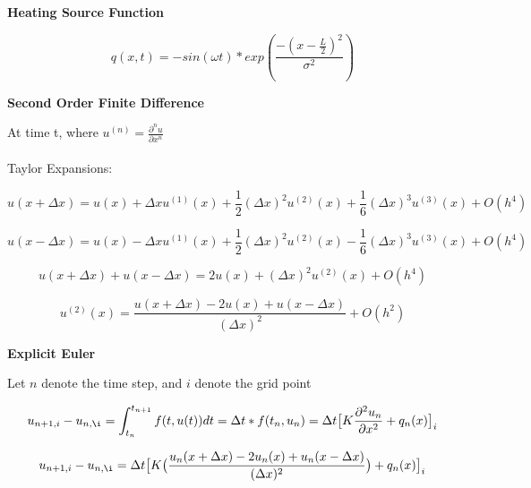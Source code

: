 \documentclass[10pt, letter, showtrims]{extarticle}
\begin{document}
		\noindent
		\textbf{Heating Source Function}
		
		
		\begin{equation}
			q(x, t) = -sin(\omega t) * exp\left(\frac{-(x - \frac{L}{2})^{2}}{\sigma^{2}}\right)
		\end{equation}	
	
		\noindent
		\textbf{Second Order Finite Difference}
		
		\noindent
		At time t, where $u^{(n)} = \frac{\partial^{n} u}{\partial x^{n}}$  \\ \\
		Taylor Expansions:
		
		\begin{equation}
			u(x + \Delta x) = u(x) + \Delta x u^{(1)}(x) + \frac{1}{2} (\Delta x)^{2} u^{(2)}(x) + \frac{1}{6} (\Delta x)^{3} u^{(3)}(x) + O(h^{4})
		\end{equation}	
		
		\begin{equation}
			u(x - \Delta x) = u(x) - \Delta x u^{(1)}(x) + \frac{1}{2} (\Delta x)^{2} u^{(2)}(x) - \frac{1}{6} (\Delta x)^{3} u^{(3)}(x) + O(h^{4})
		\end{equation}
		
		\begin{equation}
			u(x + \Delta x) + u(x - \Delta x) = 2u(x) + (\Delta x)^{2} u^{(2)}(x) + O(h^{4})
		\end{equation}	
		
		\begin{equation}
			u^{(2)}(x) = \frac{u(x + \Delta x) - 2 u(x) + u(x - \Delta x)}{(\Delta x)^{2}} + O(h^{2})
		\end{equation}	
		
		\pagebreak
		
		\noindent
		\textbf{Explicit Euler}

		\noindent
		Let $n$ denote the time step, and $i$ denote the grid point
		
		\begin{equation}
			u_{n+1,i} - u_{n,\i} = \int_{t_{n}}^{t_{n+1}} f(t, u(t)) dt = \Delta t * f(t_{n}, u_{n}) = \Delta t \big[ K \frac{\partial^{2} u_{n}}{\partial x^{2}} + q_{n}(x) \big]_{i}
		\end{equation}	
		
		\begin{equation}
			u_{n+1,i} - u_{n,\i} = \Delta t \big[ K \big(\frac{u_{n}(x + \Delta x) - 2 u_{n}(x) + u_{n}(x - \Delta x)}{(\Delta x)^{2}}\big) + q_{n}(x) \big]_{i}
		\end{equation}
		
\end{document}
